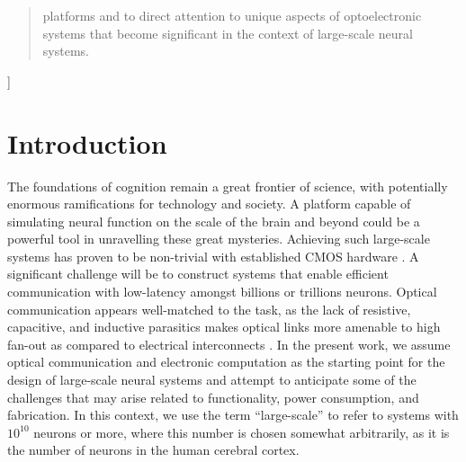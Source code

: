 \documentclass[twocolumn]{article}
\begin{document}
\begin{@twocolumnfalse}
\begin{abstract}
platforms and to direct attention to unique aspects of optoelectronic systems that become significant in the context of large-scale neural systems. 
\vspace{2em}
\end{abstract}
\end{@twocolumnfalse}
]

\setcounter{tocdepth}{4}
\setcounter{secnumdepth}{4}

\section{\label{sec:introduction}Introduction}

The foundations of cognition remain a great frontier of science, with potentially enormous ramifications for technology and society. A platform capable of simulating neural function on the scale of the brain and beyond could be a powerful tool in unravelling these great mysteries. Achieving such large-scale systems has proven to be non-trivial with established CMOS hardware \cite{furber2016large}. A significant challenge will be to construct systems that enable efficient communication with low-latency amongst billions or trillions neurons. Optical communication appears well-matched to the task, as the lack of resistive, capacitive, and inductive parasitics makes optical links more amenable to high fan-out as compared to electrical interconnects \cite{shainline2018largest}. In the present work, we assume optical communication and electronic computation as the starting point for the design of large-scale neural systems and attempt to anticipate some of the challenges that may arise related to functionality, power consumption, and fabrication. In this context, we use the term ``large-scale'' to refer to systems with $10^{10}$ neurons or more, where this number is chosen somewhat arbitrarily, as it is the number of neurons in the human cerebral cortex.
\end{document}
